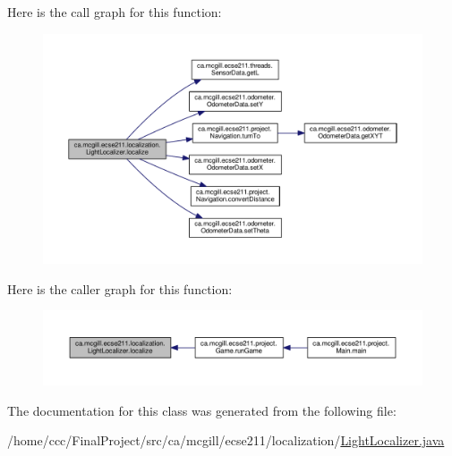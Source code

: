 Here is the call graph for this function\+:\nopagebreak
\begin{figure}[H]
\begin{center}
\leavevmode
\includegraphics[width=350pt]{classca_1_1mcgill_1_1ecse211_1_1localization_1_1_light_localizer_a9fc3d6cdd897e9db86fc9d71dc914863_cgraph}
\end{center}
\end{figure}
Here is the caller graph for this function\+:\nopagebreak
\begin{figure}[H]
\begin{center}
\leavevmode
\includegraphics[width=350pt]{classca_1_1mcgill_1_1ecse211_1_1localization_1_1_light_localizer_a9fc3d6cdd897e9db86fc9d71dc914863_icgraph}
\end{center}
\end{figure}


The documentation for this class was generated from the following file\+:\begin{DoxyCompactItemize}
\item 
/home/ccc/\+Final\+Project/src/ca/mcgill/ecse211/localization/\hyperlink{_light_localizer_8java}{Light\+Localizer.\+java}\end{DoxyCompactItemize}
